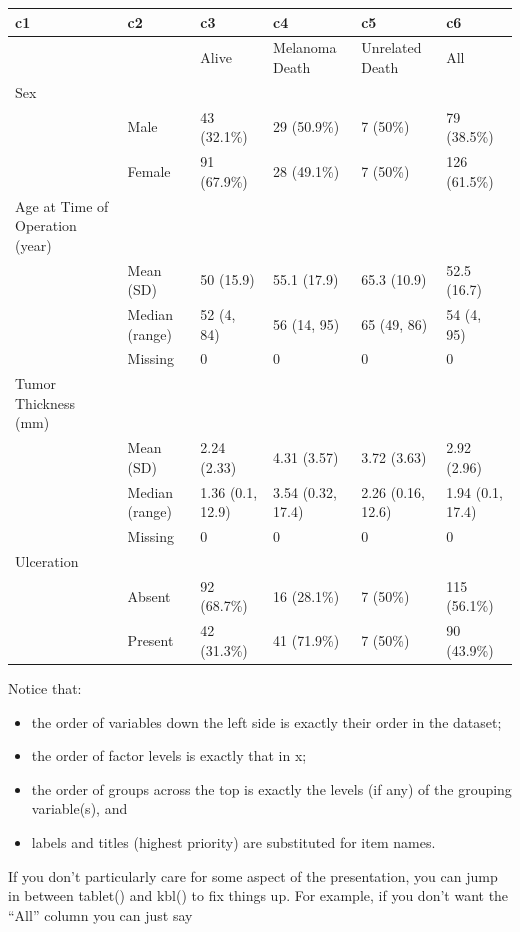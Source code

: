 \documentclass[
]{article}
\providecommand{\tightlist}{%
  \setlength{\itemsep}{0pt}\setlength{\parskip}{0pt}}
\begin{document}
\begin{tabular}[t]{l|l|l|l|l|l}
\hline
c1 & c2 & c3 & c4 & c5 & c6\\
\hline
 &  & Alive & Melanoma Death & Unrelated Death & All\\
\hline
Sex &  &  &  &  & \\
\hline
 & Male & 43 (32.1\%) & 29 (50.9\%) & 7 (50\%) & 79 (38.5\%)\\
\hline
 & Female & 91 (67.9\%) & 28 (49.1\%) & 7 (50\%) & 126 (61.5\%)\\
\hline
Age at Time of Operation (year) &  &  &  &  & \\
\hline
 & Mean (SD) & 50 (15.9) & 55.1 (17.9) & 65.3 (10.9) & 52.5 (16.7)\\
\hline
 & Median (range) & 52 (4, 84) & 56 (14, 95) & 65 (49, 86) & 54 (4, 95)\\
\hline
 & Missing & 0 & 0 & 0 & 0\\
\hline
Tumor Thickness (mm) &  &  &  &  & \\
\hline
 & Mean (SD) & 2.24 (2.33) & 4.31 (3.57) & 3.72 (3.63) & 2.92 (2.96)\\
\hline
 & Median (range) & 1.36 (0.1, 12.9) & 3.54 (0.32, 17.4) & 2.26 (0.16, 12.6) & 1.94 (0.1, 17.4)\\
\hline
 & Missing & 0 & 0 & 0 & 0\\
\hline
Ulceration &  &  &  &  & \\
\hline
 & Absent & 92 (68.7\%) & 16 (28.1\%) & 7 (50\%) & 115 (56.1\%)\\
\hline
 & Present & 42 (31.3\%) & 41 (71.9\%) & 7 (50\%) & 90 (43.9\%)\\
\hline
\end{tabular}

Notice that:

\begin{itemize}
\tightlist
\item
  the order of variables down the left side is exactly their order in
  the dataset;
\item
  the order of factor levels is exactly that in x;
\item
  the order of groups across the top is exactly the levels (if any) of
  the grouping variable(s), and
\item
  labels and titles (highest priority) are substituted for item names.
\end{itemize}

If you don't particularly care for some aspect of the presentation, you
can jump in between tablet() and kbl() to fix things up. For example, if
you don't want the ``All'' column you can just say
\end{document}
